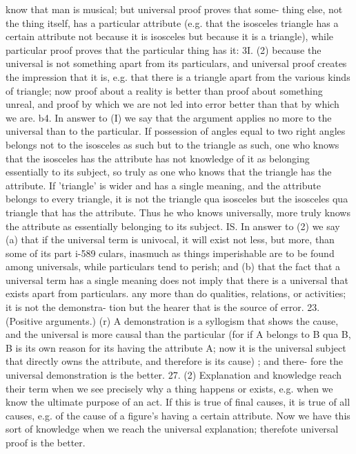 {{{{{{{{{{{{{{{{{{{{{{{{{{{{{{{{know that man is musical; but universal proof proves that some-
thing else, not the thing itself, has a particular attribute (e.g.
that the isosceles triangle has a certain attribute not because it
is isosceles but because it is a triangle), while particular proof
proves that the particular thing has it:
3I. (2) because the universal is not something apart from its
particulars, and universal proof creates the impression that it
is, e.g. that there is a triangle apart from the various kinds of
triangle; now proof about a reality is better than proof about
something unreal, and proof by which we are not led into error
better than that by which we are.
b4. In answer to (I) we say that the argument applies no more
to the universal than to the particular. If possession of angles
equal to two right angles belongs not to the isosceles as such
but to the triangle as such, one who knows that the isosceles has
the attribute has not knowledge of it as belonging essentially
to its subject, so truly as one who knows that the triangle has
the attribute. If 'triangle' is wider and has a single meaning,
and the attribute belongs to every triangle, it is not the triangle
qua isosceles but the isosceles qua triangle that has the attribute.
Thus he who knows universally, more truly knows the attribute
as essentially belonging to its subject.
IS. In answer to (2) we say (a) that if the universal term is
univocal, it will exist not less, but more, than some of its part i-589
culars, inasmuch as things imperishable are to be found among
universals, while particulars tend to perish; and (b) that the fact
that a universal term has a single meaning does not imply that
there is a universal that exists apart from particulars. any more
than do qualities, relations, or activities; it is not the demonstra-
tion but the hearer that is the source of error.
23. (Positive arguments.) (r) A demonstration is a syllogism
that shows the cause, and the universal is more causal than the
particular (for if A belongs to B qua B, B is its own reason for
its having the attribute A; now it is the universal subject that
directly owns the attribute, and therefore is its cause) ; and there-
fore the universal demonstration is the better.
27. (2) Explanation and knowledge reach their term when we
see precisely why a thing happens or exists, e.g. when we know
the ultimate purpose of an act. If this is true of final causes, it
is true of all causes, e.g. of the cause of a figure's having a certain
attribute. Now we have this sort of knowledge when we reach
the universal explanation; therefote universal proof is the better.
}}}}}}}}}}}}}}}}}}}}}}}}}}}}}}}}
